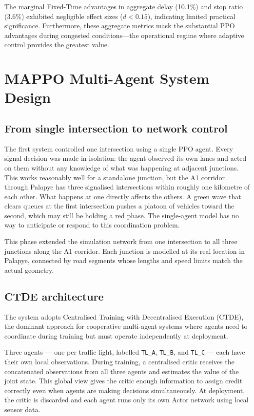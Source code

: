 \documentclass[11pt, a4paper]{report}
\begin{document}
The marginal Fixed-Time advantages in aggregate delay (10.1\%) and stop ratio (3.6\%) exhibited negligible effect sizes ($d < 0.15$), indicating limited practical significance. Furthermore, these aggregate metrics mask the substantial PPO advantages during congested conditions---the operational regime where adaptive control provides the greatest value.

\chapter{MAPPO Multi-Agent System Design}
\label{chap:mappo_system}

\section{From single intersection to network control}

The first system controlled one intersection using a single PPO agent. Every signal decision was made in isolation: the agent observed its own lanes and acted on them without any knowledge of what was happening at adjacent junctions. This works reasonably well for a standalone junction, but the A1 corridor through Palapye has three signalised intersections within roughly one kilometre of each other. What happens at one directly affects the others. A green wave that clears queues at the first intersection pushes a platoon of vehicles toward the second, which may still be holding a red phase. The single-agent model has no way to anticipate or respond to this coordination problem.

This phase extended the simulation network from one intersection to all three junctions along the A1 corridor. Each junction is modelled at its real location in Palapye, connected by road segments whose lengths and speed limits match the actual geometry.

\section{CTDE architecture}

The system adopts Centralised Training with Decentralised Execution (CTDE), the dominant approach for cooperative multi-agent systems where agents need to coordinate during training but must operate independently at deployment.

Three agents --- one per traffic light, labelled \texttt{TL\_A}, \texttt{TL\_B}, and \texttt{TL\_C} --- each have their own local observations. During training, a centralised critic receives the concatenated observations from all three agents and estimates the value of the joint state. This global view gives the critic enough information to assign credit correctly even when agents are making decisions simultaneously. At deployment, the critic is discarded and each agent runs only its own Actor network using local sensor data.
\end{document}
